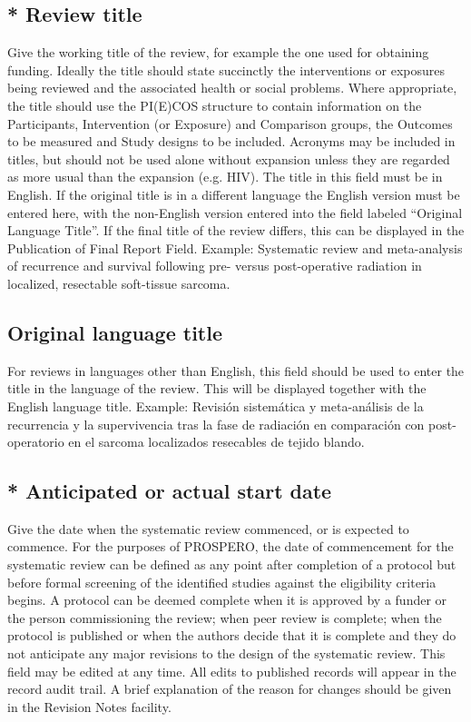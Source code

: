 \documentclass{qqtarticle}
\begin{document}
    \subsection{* Review title}
    Give the working title of the review, for example the one used for obtaining funding. Ideally the title should state succinctly
    the interventions or exposures being reviewed and the associated health or social problems. Where appropriate, the title
    should use the PI(E)COS structure to contain information on the Participants, Intervention (or Exposure) and Comparison
    groups, the Outcomes to be measured and Study designs to be included.
    Acronyms may be included in titles, but should not be used alone without expansion unless they are regarded as more
    usual than the expansion (e.g. HIV).
    The title in this field must be in English. If the original title is in a different language the English version must be entered
    here, with the non-English version entered into the field labeled “Original Language Title”.
    If the final title of the review differs, this can be displayed in the Publication of Final Report Field.
    Example: Systematic review and meta-analysis of recurrence and survival following pre- versus post-operative radiation
    in localized, resectable soft-tissue sarcoma.

    \subsection{Original language title}
    For reviews in languages other than English, this field should be used to enter the title in the language of the review. This
    will be displayed together with the English language title.
    Example: Revisión sistemática y meta-análisis de la recurrencia y la supervivencia tras la fase de radiación en
    comparación con post-operatorio en el sarcoma localizados resecables de tejido blando.

    \subsection{* Anticipated or actual start date}
    Give the date when the systematic review commenced, or is expected to commence.
    For the purposes of PROSPERO, the date of commencement for the systematic review can be defined as any point after
    completion of a protocol but before formal screening of the identified studies against the eligibility criteria begins.
    A protocol can be deemed complete when it is approved by a funder or the person commissioning the review; when peer
    review is complete; when the protocol is published or when the authors decide that it is complete and they do not
    anticipate any major revisions to the design of the systematic review.
    This field may be edited at any time. All edits to published records will appear in the record audit trail. A brief explanation of
    the reason for changes should be given in the Revision Notes facility.
\end{document}
